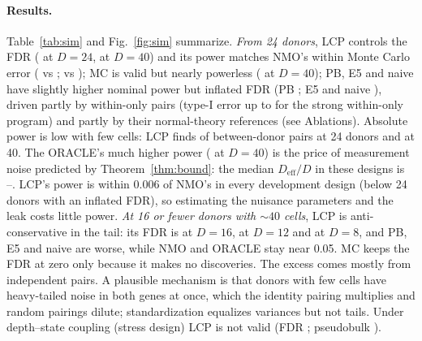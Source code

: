 \documentclass[10pt,letterpaper]{article}
\theoremstyle{definition}
\newcommand{\Deff}{D_{\mathrm{eff}}}
\begin{document}
\paragraph{Results.} Table~\ref{tab:sim} and Fig.~\ref{fig:sim} summarize. \emph{From 24 donors}, LCP controls the FDR (\LCPFDRDtwentyfour{} at $D=24$, \LCPFDRDforty{} at $D=40$) and its power matches NMO's within Monte Carlo error (\LCPpowDtwentyfour{} vs \BOUNDpowDtwentyfour{}; \LCPpowDforty{} vs \BOUNDpowDforty{}); MC is valid but nearly powerless (\MCpowDforty{} at $D=40$); PB, E5 and naive have slightly higher nominal power but inflated FDR (PB \PBFDRrange{}; E5 and naive \OtherFDRrange{}), driven partly by within-only pairs (type-I error up to \PBSSmax{} for the strong within-only program) and partly by their normal-theory references (see Ablations). Absolute power is low with few cells: LCP finds \LCPpowDtwentyfour{} of between-donor pairs at 24 donors and \LCPpowDforty{} at 40. The ORACLE's much higher power (\ORACLEpowDforty{} at $D=40$) is the price of measurement noise predicted by Theorem~\ref{thm:bound}: the median $\Deff/D$ in these designs is \DeffSimMin{}--\DeffSimMax{}. LCP's power is within 0.006 of NMO's in every development design (below 24 donors with an inflated FDR), so estimating the nuisance parameters and the leak costs little power. \emph{At 16 or fewer donors with ${\sim}40$ cells}, LCP is anti-conservative in the tail: its FDR is \LCPFDRDsixteen{} at $D=16$, \LCPFDRDtwelve{} at $D=12$ and \LCPFDRDeight{} at $D=8$, and PB, E5 and naive are worse, while NMO and ORACLE stay near 0.05. MC keeps the FDR at zero only because it makes no discoveries. The excess comes mostly from independent pairs. A plausible mechanism is that donors with few cells have heavy-tailed noise in both genes at once, which the identity pairing multiplies and random pairings dilute; standardization equalizes variances but not tails. Under depth--state coupling (stress design) LCP is not valid (FDR \STRESSLCPFDR{}; pseudobulk \STRESSPBFDR{}).
\end{document}
